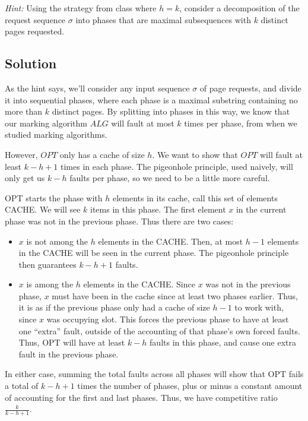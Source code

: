 \documentclass{article}
\begin{document}
    \vspace{2mm}
    \textit{Hint:} Using the strategy from class where $h=k$, consider a decomposition of
    the request sequence $\sigma$ into phases that are maximal subsequences with $k$
    distinct pages requested.


\subsection*{Solution}
    As the hint says, we'll consider any input sequence $\sigma$ of page requests, and divide it into sequential phases, where each phase is a maximal substring containing no more than $k$ distinct pages.  By splitting into phases in this way, we know that our marking algorithm $ALG$ will fault at most $k$ times per phase, from when we studied marking algorithms.

    \vspace{3mm}
    However, $OPT$ only has a cache of size $h$. We want to show that $OPT$ will fault at least $k-h+1$ times in each phase. The pigeonhole principle, used naively, will only get us $k-h$ faults per phase, so we need to be a little more careful.

    \vspace{3mm}
    OPT starts the phase with $h$ elements in its cache, call this set of elements CACHE. We will see $k$ items in this phase. The first element $x$ in the current phase was not in the previous phase. Thus there are two cases:
    \begin{itemize}
        \item $x$ is not among the $h$ elements in the CACHE. Then, at most $h-1$ elements in the CACHE will be seen in the current phase. The pigeonhole principle then guarantees $k-h+1$ faults.
        \item $x$ is among the $h$ elements in the CACHE. Since $x$ was not in the previous phase, $x$ must have been in the cache since at least two phases earlier. Thus, it is as if the previous phase only had a cache of size $h-1$ to work with, since $x$ was occupying  slot. This forces the previous phase to have at least one ``extra'' fault, outside of the accounting of that phase's own forced faults. Thus, OPT will have at least $k-h$ faults in this phase, and cause one extra fault in the previous phase.
    \end{itemize}
    In either case, summing the total faults across all phases will show that OPT fails a total of $k-h+1$ times the number of phases, plus or minus a constant amount of accounting for the first and last phases.
    Thus, we have competitive ratio $\frac{k}{k-h+1}$.
\end{document}
